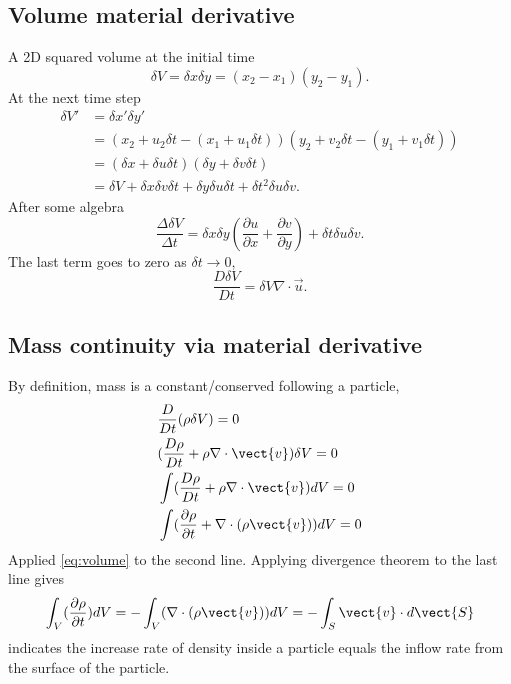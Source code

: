 \subsection{Volume material derivative}
A 2D squared volume at the initial time
\begin{equation}
    \delta V = \delta x \delta y = (x_2-x_1)(y_2-y_1).
\end{equation}
At the next time step
\begin{equation}
    \begin{aligned}
    \delta V' & = \delta x' \delta y'  \\
              & = (x_2+u_2\delta t - (x_1+u_1\delta t))(y_2+v_2\delta t - (y_1+v_1\delta t)) \\
              & = (\delta x + \delta u \delta t)(\delta y + \delta v \delta t) \\
              & = \delta V + \delta x \delta v \delta t + \delta y \delta u \delta t + \delta t^2 \delta u \delta v.
    \end{aligned}
\end{equation}
After some algebra
\begin{equation}
    \frac{\Delta \delta V}{\Delta t} = \delta x \delta y (\frac{\partial u}{\partial x} + \frac{\partial v}{\partial y}) + \delta t \delta u \delta v.
\end{equation}
The last term goes to zero as $\delta t \rightarrow 0$,
\begin{equation} \label{eq:volume}
    \frac{D \delta V}{D t} = \delta V \nabla \cdot \vec{u}.
\end{equation}

\subsection{Mass continuity via material derivative}
By definition, mass is a constant/conserved following a particle,
\begin{equation}
    \begin{aligned}
        & \frac{D}{Dt} (\rho \delta V) = 0  \\
        & (\frac{D\rho}{Dt} + \rho\nabla \cdot \vect{v})\delta V = 0 \\
        & \int(\frac{D\rho}{Dt} + \rho\nabla\cdot\vect{v})dV = 0 \\
        & \int(\frac{\partial\rho}{\partial t} + \nabla\cdot(\rho\vect{v}))dV = 0 \\
    \end{aligned}
\end{equation}
Applied \eqref{eq:volume} to the second line.
Applying divergence theorem to the last line gives
\begin{equation}
    \int_V(\frac{\partial\rho}{\partial t})dV = -\int_V(\nabla\cdot(\rho\vect{v}))dV = -\int_S \vect{v} \cdot d\vect{S}
\end{equation}
indicates the increase rate of density inside a particle equals the inflow rate from the surface of the particle.

